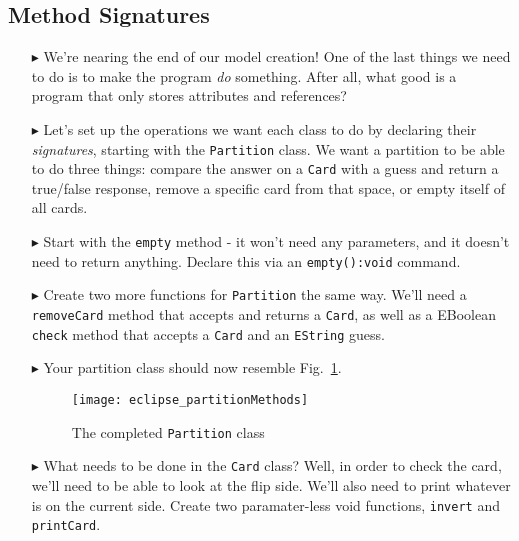 \newpage
\subsection{Method Signatures}
\texHeader
\hypertarget{static:methods tex}{}

\begin{itemize}

\item[$\blacktriangleright$] We're nearing the end of our model creation! One of the last things we need to do is to make the program \emph{do} something. After
all, what good is a program that only stores attributes and references?

\item[$\blacktriangleright$] Let's set up the operations we want each class to do by declaring their \emph{signatures}, starting with the
\texttt{Partition} class. We want a partition to be able to do three things: compare the answer on a \texttt{Card} with a guess and return a true/false
response, remove a specific card from that space, or empty itself of all cards.

\item[$\blacktriangleright$] Start with the \texttt{empty} method - it won't need any parameters, and it doesn't need to return anything. Declare this via an
\texttt{empty():void} command.

\item[$\blacktriangleright$] Create two more functions for \texttt{Partition} the same way. We'll need a \texttt{removeCard} method that accepts and returns a
\texttt{Card}, as well as a EBoolean \texttt{check} method that accepts a \texttt{Card} and an \texttt{EString} guess. 

\item[$\blacktriangleright$] Your partition class should now resemble Fig.~\ref{fig:partitionMethods}.

\vspace{0.5cm}

\begin{figure}[htbp]
	\centering
  \texttt{[image: eclipse\_partitionMethods]}
	\caption{The completed \texttt{Partition} class}
	\label{fig:partitionMethods}
\end{figure}

\vspace{0.5cm}

\item[$\blacktriangleright$] What needs to be done in the \texttt{Card} class? Well, in order to check the card, we'll need to be able to look at the flip side.
We'll also need to print whatever is on the current side. Create two paramater-less void functions, \texttt{invert} and \texttt{printCard}. 


\end{itemize}
